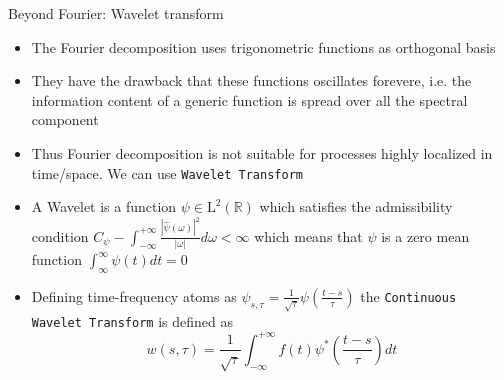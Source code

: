 \documentclass[t,10pt]{beamer}
\begin{document}
\begin{frame}{Beyond Fourier: Wavelet transform}
\begin{itemize}[<+->]
\item The Fourier decomposition uses trigonometric functions as
  orthogonal basis
\item They have the drawback that these functions oscillates forevere,
  i.e. the information content of a generic function is spread over
  all the spectral component
\item Thus Fourier decomposition is not suitable for processes highly
  localized in time/space. We can use
  \textcolor{tachameleon}{\texttt{Wavelet Transform}}{\footnotesize \parencite{Farge:1992un}}
\item A Wavelet is a function $\psi\in \mathrm{L}^2(\mathbb{R})$ which
  satisfies the admissibility condition
  $C_{\psi}-\int_{-\infty}^{+\infty}\frac{|\hat{\psi}(\omega)|^2}{|\omega|}d\omega
  < \infty$ which means that $\psi$ is a zero mean function
  $\int_{\infty}^{\infty}\psi(t)dt =0$
\item Defining time-frequency atoms as
  $\psi_{s,\tau}=\frac{1}{\sqrt{\tau}}\psi\left(\frac{t-s}{\tau}\right)$ the
  \textcolor{tachameleon}{\texttt{Continuous Wavelet Transform}} is
  defined as 
\begin{equation*}
w(s,\tau)=\frac{1}{\sqrt{\tau}}\int_{-\infty}^{+\infty}f(t)\psi^{*}\left(\frac{t-s}{\tau}\right)dt
\end{equation*}
\end{itemize}
\end{frame}
\end{document}
